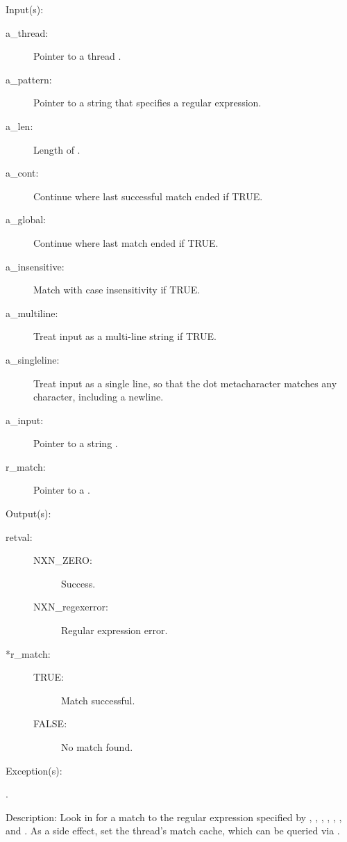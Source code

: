 \begin{capi}
	\begin{capilist}
	\item[Input(s): ]
		\begin{description}\item[]
		\item[a\_thread: ]
			Pointer to a thread .
		\item[a\_pattern: ]
			Pointer to a string that specifies a regular expression.
		\item[a\_len: ]
			Length of .
		\item[a\_cont: ]
			Continue where last successful match ended if TRUE.
		\item[a\_global: ]
			Continue where last match ended if TRUE.
		\item[a\_insensitive: ]
			Match with case insensitivity if TRUE.
		\item[a\_multiline: ]
			Treat input as a multi-line string if TRUE.
		\item[a\_singleline: ]
			Treat input as a single line, so that the dot
			metacharacter matches any character, including a
			newline.
		\item[a\_input: ]
			Pointer to a string .
		\item[r\_match: ]
			Pointer to a .
		\end{description}
	\item[Output(s): ]
		\begin{description}\item[]
		\item[retval: ]
			\begin{description}\item[]
			\item[NXN\_ZERO: ] Success.
			\item[NXN\_regexerror: ] Regular expression error.
			\end{description}
		\item[*r\_match: ]
			\begin{description}\item[]
			\item[TRUE: ] Match successful.
			\item[FALSE: ] No match found.
			\end{description}
		\end{description}
	\item[Exception(s): ]
		\begin{description}\item[]
		\item[.]
		\end{description}
	\item[Description: ]
		Look in  for a match to the regular expression
		specified by , , ,
		, , ,
		and .  As a side effect, set the thread's
		match cache, which can be queried via
		.


\end{capilist}
\end{capi}
